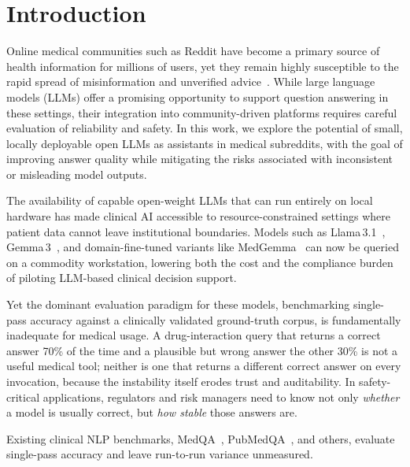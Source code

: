 \documentclass[11pt]{article}
\begin{document}
\section{Introduction}

Online medical communities such as Reddit have become a primary 
source of health information for millions of users, yet they remain 
highly susceptible to the rapid spread of misinformation and unverified
advice~\cite{suarezlledo2021misinfo, sager2021reddit}.
While large language models (LLMs) offer a promising opportunity to support
question answering in these settings, their integration into
community-driven platforms requires careful evaluation of reliability
and safety. In this work, we explore the potential of small,
locally deployable open LLMs as assistants in medical subreddits,
with the goal of improving answer quality while mitigating the
risks associated with inconsistent or misleading model outputs.

The availability of capable open-weight LLMs that can run entirely
on local hardware has made clinical AI accessible to resource-constrained
settings where patient data cannot leave institutional boundaries.
Models such as Llama\,3.1~\cite{dubey2024llama3},
Gemma\,3~\cite{team2024gemma}, and domain-fine-tuned variants like
MedGemma~\cite{medgemma2024} can now be queried on a commodity
workstation, lowering both the cost and the compliance burden of
piloting LLM-based clinical decision support.

Yet the dominant evaluation paradigm for these models, benchmarking
single-pass accuracy against a clinically validated ground-truth corpus, 
is fundamentally inadequate for medical usage.
A drug-interaction query that returns a correct answer 70\% of the time
and a plausible but wrong answer the other 30\% is not a useful medical
tool; neither is one that returns a different correct answer on every
invocation, because the instability itself erodes trust and
auditability.
In safety-critical applications, regulators and risk managers need to
know not only \emph{whether} a model is usually correct, but
\emph{how stable} those answers are.

Existing clinical NLP benchmarks, MedQA~\cite{jin2021disease},
PubMedQA~\cite{jin2019pubmedqa}, and others, evaluate single-pass
accuracy and leave run-to-run variance unmeasured.
\end{document}

